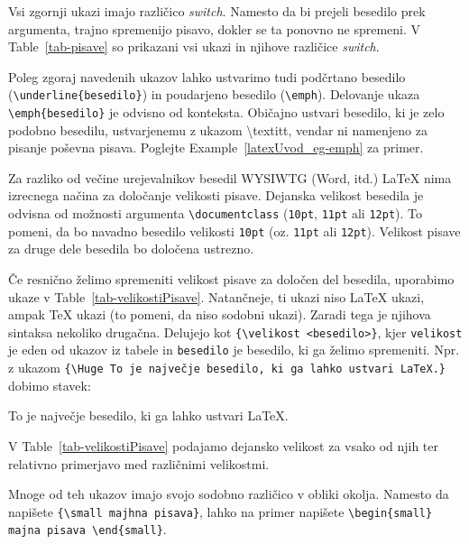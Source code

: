 Vsi zgornji ukazi imajo različico \textit{switch}. Namesto da bi prejeli besedilo prek argumenta, trajno spremenijo pisavo, dokler se ta ponovno ne spremeni. V Table~\ref{tab-pisave} so prikazani vsi ukazi in njihove različice \textit{switch}.

\begin{example}\label{latexuvod_eg-switch}\end{example}Poleg zgoraj navedenih ukazov lahko ustvarimo tudi podčrtano besedilo (\texttt{{\textbackslash}underline\{besedilo\}}) in poudarjeno besedilo (\texttt{{\textbackslash}emph}).
Delovanje ukaza \texttt{{\textbackslash}emph\{besedilo\}} je odvisno od konteksta. Običajno ustvari besedilo, ki je zelo podobno besedilu, ustvarjenemu z ukazom {\textbackslash}textitt, vendar ni namenjeno za pisanje poševna pisava. Poglejte Example~\ref{latexUvod_eg-emph} za primer.

\begin{example}\label{latexuvod_eg-emph}\end{example}Za razliko od večine urejevalnikov besedil WYSIWTG (Word, itd.) LaTeX nima izrecnega načina za določanje velikosti pisave.
Dejanska velikost besedila je odvisna od možnosti argumenta \texttt{{\textbackslash}documentclass} (\texttt{10pt}, \texttt{11pt} ali \texttt{12pt}).
To pomeni, da bo navadno besedilo velikosti \texttt{10pt} (oz. \texttt{11pt} ali \texttt{12pt}).
Velikost pisave za druge dele besedila bo določena ustrezno.

Če resnično želimo spremeniti velikost pisave za določen del besedila, uporabimo ukaze v Table~\ref{tab-velikostiPisave}.
Natančneje, ti ukazi niso LaTeX ukazi, ampak TeX ukazi (to pomeni, da niso sodobni ukazi).
Zaradi tega je njihova sintaksa nekoliko drugačna.
Delujejo kot \texttt{\{{\textbackslash}velikost \textless besedilo\textgreater \}}, kjer \texttt{velikost} je eden od ukazov iz tabele in \texttt{besedilo} je besedilo, ki ga želimo spremeniti.
Npr. z ukazom \texttt{\{{\textbackslash}Huge  To je največje besedilo, ki ga lahko ustvari LaTeX.\}}  dobimo stavek:

To je največje besedilo, ki ga lahko ustvari LaTeX.

V Table~\ref{tab-velikostiPisave} podajamo dejansko velikost za vsako od njih ter relativno primerjavo med različnimi velikostmi.

Mnoge od teh ukazov imajo svojo sodobno različico v obliki okolja. Namesto da napišete \texttt{\{{\textbackslash}small majhna pisava\}}, lahko na primer napišete \texttt{{\textbackslash}begin\{small\} majna pisava {\textbackslash}end\{small\}}.

